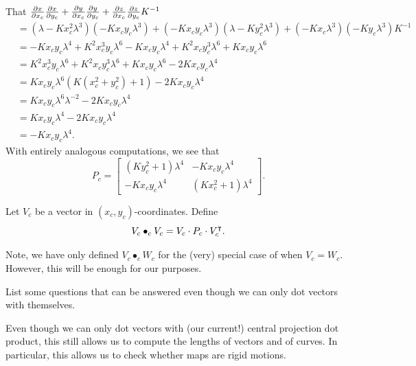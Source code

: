 \documentclass{ximera}
\begin{document}
\begin{problem}
\begin{freeResponse}
    That $\pp[x]{x_c}\pp[x]{y_c} + \pp[y]{x_c}\pp[y]{y_c} + \pp[z]{x_c}\pp[z]{y_c} K^{-1}$
    \begin{align*}
      &=\left(\lambda -Kx_c^2 \lambda^3\right)\left(-Kx_cy_c \lambda^3\right) + \left(-Kx_cy_c \lambda^3\right)\left(\lambda - Ky_c^2 \lambda^3\right) + \left(-Kx_c \lambda^3\right)\left(-Ky_c \lambda^3\right)K^{-1}\\
      &= -Kx_cy_c\lambda^4+K^2x_c^3y_c\lambda^6-Kx_cy_c\lambda^4+K^2x_cy_c^3\lambda^6+Kx_cy_c\lambda^6\\
      &= K^2x_c^3y_c\lambda^6+K^2x_cy_c^3\lambda^6+Kx_cy_c\lambda^6 -2Kx_cy_c\lambda^4\\
      &= Kx_cy_c\lambda^6\left(K\left(x_c^2 + y_c^2\right) + 1\right)-2Kx_cy_c\lambda^4\\
      &= Kx_cy_c\lambda^6\lambda^{-2} -2Kx_cy_c\lambda^4\\
      &= Kx_cy_c\lambda^4 -2Kx_cy_c\lambda^4\\
      &= -Kx_cy_c\lambda^4.
    \end{align*}
    With entirely analogous computations, we see that 
    \[
     P_c =
     \begin{bmatrix}
       \left(Ky_c^2+1\right)\lambda^4 & -Kx_{c}y_{c}\lambda^4\\
       -Kx_{c}y_{c}\lambda^4 & \left(Kx_c^2+1\right)\lambda^4
     \end{bmatrix}.
     \]
  \end{freeResponse}
\end{problem}


\begin{definition}
  Let $V_c$ be a vector in $(x_c,y_c)$-coordinates. Define
  \[
  V_c \bullet_c V_c = V_c \cdot P_c \cdot V_c^\transpose.
  \]
\end{definition}

\begin{warning}
  Note, we have only defined $V_c\bullet_c W_c$ for the (very) special
  case of when $V_c = W_c$. However, this will be enough for our
  purposes.
\end{warning}


\begin{problem}
  List some questions that can be answered even though we can only dot
  vectors with themselves.
  \begin{freeResponse}
    Even though we can only dot vectors with (our current!) central
    projection dot product, this still allows us to compute the
    lengths of vectors and of curves. In particular, this allows us to
    check whether maps are rigid motions.
  \end{freeResponse}
\end{problem}
\end{document}

